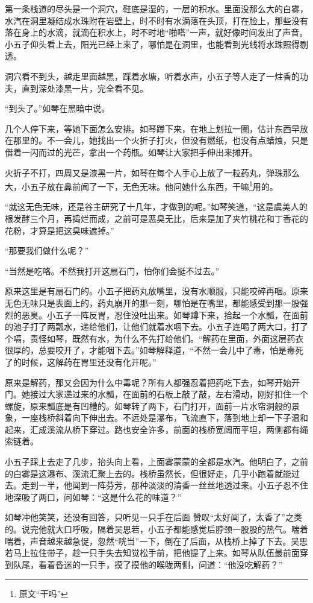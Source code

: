 第一条栈道的尽头是一个洞穴，鞋底是湿的，一层的积水。里面没那么大的白雾，水汽在洞里凝结成水珠附在岩壁上，时不时有水滴落在头顶，打在脸上，那些没有落在身上的水滴，就滴在积水上，时不时地“啪嗒”一声，就好像时间发出了声音。小五子仰头看上去，阳光已经上来了，哪怕是在洞里，也能看到光线将水珠照得剔透。

洞穴看不到头，越走里面越黑，踩着水塘，听着水声，小五子等人走了一炷香的功夫，直到深处漆黑一片，完全看不见。

“到头了。”如琴在黑暗中说。

几个人停下来，等她下面怎么安排。如琴蹲下来，在地上划拉一圈，估计东西早放在那里的。不一会儿，她找出一个火折子打火，但没有燃纸，也没有点蜡烛，只是借着一闪而过的光芒，拿出一个药瓶。如琴让大家把手伸出来摊开。

火折子不打，四周又是漆黑一片，如琴在每个人手心上放了一粒药丸，弹珠那么大，小五子放在鼻前闻了一下，无色无味。他问她什么东西，干嘛\footnote{原文“干吗”}用的。

“就这无色无味，还是谷主研究了十几年，才做到的呢。”如琴笑道，“这是虞美人的根发酵三个月，再捣烂而成，之前可是恶臭无比，后来是加了夹竹桃花和丁香花的花粉，才算是把这臭味遮掉。”

“那要我们做什么呢？”

“当然是吃咯。不然我打开这扇石门，怕你们会挺不过去。”

原来这里是有扇石门的。小五子把药丸放嘴里，没有水顺服，只能咬碎再咽。原来无色无味只是表面上的，药丸崩开的那一刻，哪怕是在嘴里，都能感受到那一股强烈的恶臭。小五子一阵反胃，忍住没吐出来。如琴蹲下来，拾起一个水瓢，在面前的池子打了两瓢水，递给他们，让他们就着水咽下去。小五子连喝了两大口，打了个嗝，责怪如琴，既然有水，为什么不先打给他们。“解药在里面，外面这层药衣很厚的，总要咬开了，才能咽下去。”如琴解释道，“不然一会儿中了毒，怕是毒死了的时候，这解药在胃里还没有化开呢。”

原来是解药，那又会因为什么中毒呢？所有人都强忍着把药吃下去，如琴开始开门。她接过大家递过来的水瓢，在面前的石板上敲了敲，左右滑动，刚好扣住一个螺旋，原来瓢底是有凹槽的。如琴转了两下，石门打开，面前一片水帘洞般的景象，一座栈桥斜着向下伸出去。不远处是瀑布，飞流直下，落到地上却一下子温和起来，汇成溪流从桥下穿过。路也安全许多，前面的栈桥宽阔而平坦，两侧都有绳索链着。

小五子踩上去走了几步，抬头向上看，上面雾蒙蒙的全都是水汽。他明白了，之前的白雾是这瀑布、溪流汇聚上去的。栈桥虽然长，但很好走，几乎小跑着就能过去。走到一半，他闻到一阵芬芳，那种淡淡的清香一丝丝地透过来。小五子忍不住地深吸了两口，问如琴：“这是什么花的味道？”

如琴冲他笑笑，还没有回答，只听见一只手在后面
赞叹“太好闻了，太香了”之类的。说完他就大口呼吸，隔着吴思若，小五子都能感觉后脖颈一股股的热气。喘着喘着，声音越来越急促，忽然“咣当”一下，倒在了后面，从栈桥上掉了下去。吴思若马上拉住带子，趁一只手失去知觉松手前，把他提了上来。如琴从队伍最前面穿到队尾，看着昏迷的一只手，摸了摸他的喉咙两侧，问道：“他没吃解药？”

